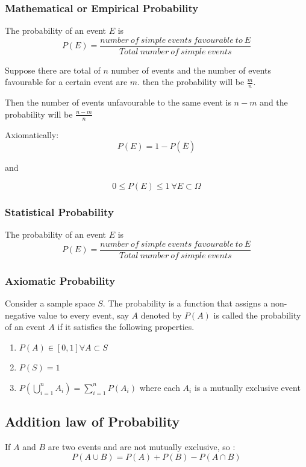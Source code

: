\documentclass[11pt,letterpaper]{article}
\begin{document}
\subsubsection{Mathematical or Empirical Probability}

The probability of an event $E$ is 
\[
  P(E) = \frac{number\ of\ simple\ events\ favourable\ to\ E}{Total\ number\ of\ simple\ events}
\]

Suppose there are total of $n$ number of events and the number of events favourable for a certain event are $m$. then the probability will be $\frac{m}{n}$.

Then the number of events unfavourable to the same event is $n-m$ and the probability will be $\frac{n-m}{n}$

Axiomatically:
\[
  P(E) = 1- P(\overline{E})
\]

and 

\[
  0 \leq P(E) \leq 1 \ \forall E \subset \Omega
\]

\subsubsection{Statistical Probability}
The probability of an event $E$ is 
\[
  P(E) = \frac{number\ of\ simple\ events\ favourable\ to\ E}{Total\ number\ of\ simple\ events}
\]

\subsubsection{Axiomatic Probability}
Consider a sample space $S$. The probability is a function that assigns a non-negative value to every event, say $A$ denoted by $P(A)$ is called the probability of an event $A$ if it satisfies the following properties. 
\begin{enumerate}
  \item $P(A) \in [0,1] \forall A \subset S$
  \item $P(S) = 1$
  \item $P(\bigcup_{i=1}^n A_i) = \sum_{i=1}^n P(A_i)$ where each $A_i$ is a mutually exclusive event
\end{enumerate}

\subsection{Addition law of Probability}
If $A$ and $B$ are two events and are not mutually exclusive, so : 
\[
  P(A \cup B) = P(A) + P(B) - P(A \cap B)
\]
\end{document}
